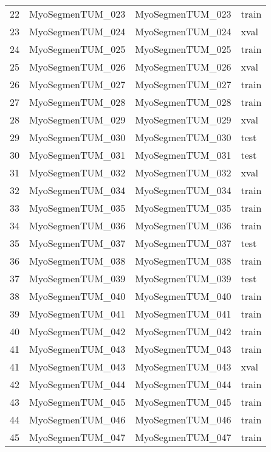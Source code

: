 \begin{SCtable}[\sidecaptionrelwidth][h]
\begin{tabular}{l m{4cm} m{4cm} l}
        22 &  MyoSegmenTUM\_023 &  MyoSegmenTUM\_023 &  train \\
        23 &  MyoSegmenTUM\_024 &  MyoSegmenTUM\_024 &   xval \\
        24 &  MyoSegmenTUM\_025 &  MyoSegmenTUM\_025 &  train \\
        25 &  MyoSegmenTUM\_026 &  MyoSegmenTUM\_026 &   xval \\
        26 &  MyoSegmenTUM\_027 &  MyoSegmenTUM\_027 &  train \\
        27 &  MyoSegmenTUM\_028 &  MyoSegmenTUM\_028 &  train \\
        28 &  MyoSegmenTUM\_029 &  MyoSegmenTUM\_029 &   xval \\
        29 &  MyoSegmenTUM\_030 &  MyoSegmenTUM\_030 &   test \\
        30 &  MyoSegmenTUM\_031 &  MyoSegmenTUM\_031 &   test \\
        31 &  MyoSegmenTUM\_032 &  MyoSegmenTUM\_032 &   xval \\
        32 &  MyoSegmenTUM\_034 &  MyoSegmenTUM\_034 &  train \\
        33 &  MyoSegmenTUM\_035 &  MyoSegmenTUM\_035 &  train \\
        34 &  MyoSegmenTUM\_036 &  MyoSegmenTUM\_036 &  train \\
        35 &  MyoSegmenTUM\_037 &  MyoSegmenTUM\_037 &   test \\
        36 &  MyoSegmenTUM\_038 &  MyoSegmenTUM\_038 &  train \\
        37 &  MyoSegmenTUM\_039 &  MyoSegmenTUM\_039 &   test \\
        38 &  MyoSegmenTUM\_040 &  MyoSegmenTUM\_040 &  train \\
        39 &  MyoSegmenTUM\_041 &  MyoSegmenTUM\_041 &  train \\
        40 &  MyoSegmenTUM\_042 &  MyoSegmenTUM\_042 &  train \\
        41 &  MyoSegmenTUM\_043 &  MyoSegmenTUM\_043 &  train \\
        41  &  MyoSegmenTUM\_043 &  MyoSegmenTUM\_043 &   xval \\
        42  &  MyoSegmenTUM\_044 &  MyoSegmenTUM\_044 &  train \\
        43  &  MyoSegmenTUM\_045 &  MyoSegmenTUM\_045 &  train \\
        44  &  MyoSegmenTUM\_046 &  MyoSegmenTUM\_046 &  train \\
        45  &  MyoSegmenTUM\_047 &  MyoSegmenTUM\_047 &  train \\

\end{tabular}
\end{SCtable}
